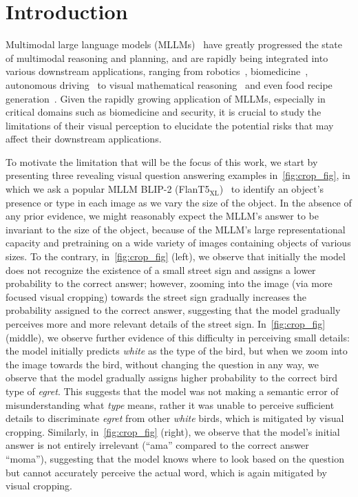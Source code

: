 \section{Introduction}
\label{sec:intro}
Multimodal large language models (MLLMs)~\citep{gpt4o,gemini,claude,qwen2vl,llavaov,kimi,r1v} have greatly progressed the state of multimodal reasoning and planning, and are rapidly being integrated into various downstream applications, ranging from robotics~\citep{llara,spatialvlm}, biomedicine~\citep{llavamed}, autonomous driving~\citep{drivegpt4,zhang2023study} to visual mathematical reasoning~\citep{gllava,mavis,euclid} and even food recipe generation~\citep{fire}. Given the rapidly growing application of MLLMs, especially in critical domains such as biomedicine and security, it is crucial to study the limitations of their visual perception to elucidate the potential risks that may affect their downstream applications.

To motivate the limitation that will be the focus of this work, we start by presenting three revealing visual question answering examples in~\cref{fig:crop_fig}, in which we ask a popular MLLM BLIP-2 (FlanT5$_\mathrm{XL}$)~\citep{li2023blip} to identify an object's presence or type in each image as we vary the size of the object.
In the absence of any prior evidence, we might reasonably expect the MLLM's answer to be invariant to the size of the object, because of the MLLM's large representational capacity and pretraining on a wide variety of images containing objects of various sizes.
To the contrary, in~\cref{fig:crop_fig} (left), we observe that initially the model does not recognize the existence of a small street sign and assigns a lower probability to the correct answer; however, zooming into the image (via more focused visual cropping) towards the street sign gradually increases the probability assigned to the correct answer, suggesting that the model gradually perceives more and more relevant details of the street sign. In~\cref{fig:crop_fig} (middle), we observe further evidence of this difficulty in perceiving small details: the model initially predicts \emph{white} as the type of the bird, but when we zoom into the image towards the bird, without changing the question in any way, we observe that the model gradually assigns higher probability to the correct bird type of \emph{egret}. This suggests that the model was not making a semantic error of misunderstanding what \emph{type} means, rather it was unable to perceive sufficient details to discriminate \emph{egret} from other \emph{white} birds, which is mitigated by visual cropping. Similarly, in~\cref{fig:crop_fig} (right), we observe that the model’s initial answer is not entirely irrelevant (``ama'' compared to the correct answer ``moma''), suggesting that the model knows where to look based on the question but cannot accurately perceive the actual word, which is again mitigated by visual cropping.


